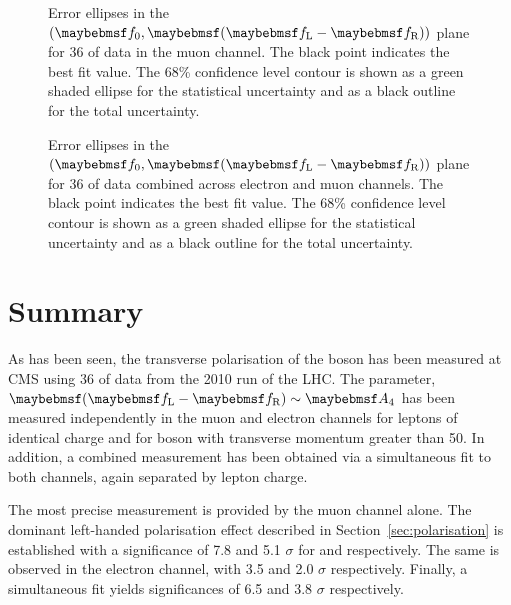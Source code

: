 \begin{figure}
\centering
{}\quad
{}
\caption{Error ellipses in the $(\f0, \fLmfR)$ plane for \unit{36}{\invpb} of
  data in the muon channel. The black point indicates the best fit
  value. The 68\% confidence level contour is shown as a green shaded ellipse
  for the statistical uncertainty and as a black outline for the total
  uncertainty.}
\label{fig:wpol_contour_mu}
\end{figure}


\begin{figure}
\centering
{}\quad
{}
\caption{Error ellipses in the $(\f0, \fLmfR)$ plane for \unit{36}{\invpb} of
  data combined across electron and muon channels. The black point indicates the
  best fit value. The 68\% confidence level contour is shown as a green shaded
  ellipse for the statistical uncertainty and as a black outline for the total
  uncertainty.}
\label{fig:wpol_contour_comb}
\end{figure}







\section{Summary}
As has been seen, the transverse polarisation of the \PW boson has been measured
at \ac{CMS} using \unit{36}{\invpb} of data from the 2010 run of the
\ac{LHC}. The parameter, $\fLmfR \sim \Afour$ has been measured independently in
the muon and electron channels for leptons of identical charge and for \PW boson
with transverse momentum greater than \unit{50}{\GeV}. In addition, a combined
measurement has been obtained via a simultaneous fit to both channels, again
separated by lepton charge.

The most precise measurement is provided by the muon channel alone. The dominant
left-handed polarisation effect described in Section~\ref{sec:polarisation} is
established with a significance of 7.8 and 5.1 $\sigma$ for \PWp and \PWm
respectively. The same is observed in the electron channel, with 3.5 and 2.0
$\sigma$ respectively. Finally, a simultaneous fit yields significances of 6.5
and 3.8 $\sigma$ respectively.

